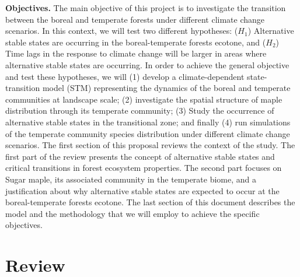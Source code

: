 \textbf{Objectives.} The main objective of this project is to investigate the
transition between the boreal and temperate forests under different climate
change scenarios. In this context, we will test two different hypotheses:
($H_1$) Alternative stable states are occurring in the boreal-temperate forests
ecotone, and ($H_2$) Time lags in the response to climate change will be larger
in areas where alternative stable states are occurring. In order to achieve the
general objective and test these hypotheses, we will (1) develop a climate-dependent
state-transition model (STM) representing the dynamics of the
boreal and temperate communities at landscape scale; (2) investigate the
spatial structure of maple distribution through its temperate community; (3)
Study the occurrence of alternative stable states in the transitional zone;
and finally (4) run simulations of the temperate community species
distribution under different climate change scenarios. The first section of
this proposal reviews the context of the study. The first part of the review
presents the concept of alternative stable states and critical transitions in
forest ecosystem properties. The second part focuses on Sugar maple, its
associated community in the temperate biome, and a justification about why
alternative stable states are expected to occur at the boreal-temperate
forests ecotone. The last section of this document describes the model and
the methodology that we will employ to achieve the specific objectives.

\section{Review}

